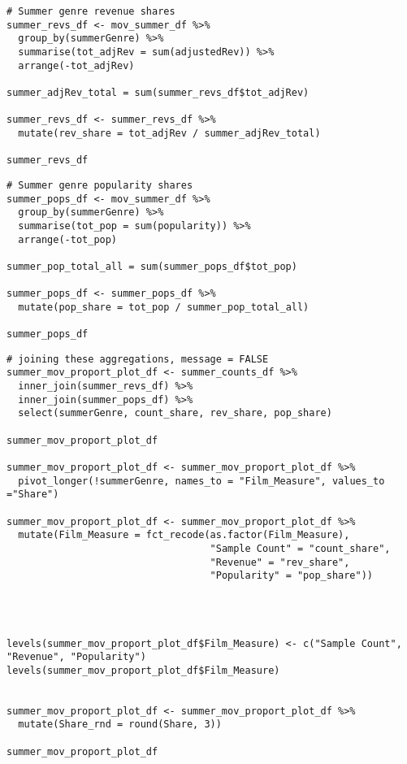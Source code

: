 \begin{lstlisting}
# Summer genre revenue shares
summer_revs_df <- mov_summer_df %>%
  group_by(summerGenre) %>%
  summarise(tot_adjRev = sum(adjustedRev)) %>%
  arrange(-tot_adjRev)

summer_adjRev_total = sum(summer_revs_df$tot_adjRev)

summer_revs_df <- summer_revs_df %>%
  mutate(rev_share = tot_adjRev / summer_adjRev_total)

summer_revs_df
\end{lstlisting}

\begin{lstlisting}
# Summer genre popularity shares
summer_pops_df <- mov_summer_df %>%
  group_by(summerGenre) %>%
  summarise(tot_pop = sum(popularity)) %>%
  arrange(-tot_pop)

summer_pop_total_all = sum(summer_pops_df$tot_pop)

summer_pops_df <- summer_pops_df %>%
  mutate(pop_share = tot_pop / summer_pop_total_all)

summer_pops_df
\end{lstlisting}

\begin{lstlisting}
# joining these aggregations, message = FALSE
summer_mov_proport_plot_df <- summer_counts_df %>%
  inner_join(summer_revs_df) %>%
  inner_join(summer_pops_df) %>%
  select(summerGenre, count_share, rev_share, pop_share)

summer_mov_proport_plot_df

summer_mov_proport_plot_df <- summer_mov_proport_plot_df %>%
  pivot_longer(!summerGenre, names_to = "Film_Measure", values_to ="Share")

summer_mov_proport_plot_df <- summer_mov_proport_plot_df %>%
  mutate(Film_Measure = fct_recode(as.factor(Film_Measure),
                                   "Sample Count" = "count_share",
                                   "Revenue" = "rev_share",
                                   "Popularity" = "pop_share"))




levels(summer_mov_proport_plot_df$Film_Measure) <- c("Sample Count", "Revenue", "Popularity")
levels(summer_mov_proport_plot_df$Film_Measure)


summer_mov_proport_plot_df <- summer_mov_proport_plot_df %>%
  mutate(Share_rnd = round(Share, 3))

summer_mov_proport_plot_df
\end{lstlisting}

